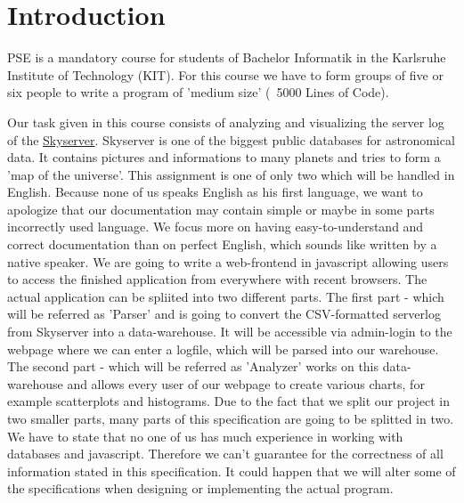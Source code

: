 \section*{Introduction}
PSE is a mandatory course for students of Bachelor Informatik in the Karlsruhe Institute of Technology (KIT). 
For this course we have to form groups of five or six people to write a program of 'medium size' (~5000 Lines of Code).

 Our task given in this course consists of
analyzing and visualizing the server log of the \href{http://skyserver.sdss.org/public/en/}{Skyserver}.
Skyserver is one of the biggest public databases for astronomical data. It contains pictures and informations to many planets
and tries to form a 'map of the universe'.
\newline\newline
This assignment is one of only two which will be handled 
in English.
Because none of us speaks English as his first language, 
we want to apologize that our documentation may contain simple 
or maybe in some parts incorrectly used language. We focus more on 
having easy-to-understand and correct documentation 
than on perfect English, which sounds like written by a native speaker.
\newline\newline
We are going to write a web-frontend in javascript allowing users 
to access the finished application from everywhere
with recent browsers. The actual application can be spliited into two 
different parts. The first part - which will be referred as 'Parser' and is going to convert the CSV-formatted 
serverlog from Skyserver into a data-warehouse. It will
be accessible via admin-login to the webpage where we can enter a 
logfile, which will be parsed into our warehouse.
The second part - which will be referred as 'Analyzer' works on this data-warehouse 
and allows every user of our webpage to create various charts, 
for example scatterplots and histograms.
Due to the fact that we split our project in two smaller parts, 
many parts of this specification are going to be splitted in two.
\newline
\newline
We have to state that no one of us has much experience in working 
with databases and javascript.
Therefore we can't guarantee for the correctness of all information 
stated in this specification.
It could happen that we will alter some of the specifications when designing or 
implementing the actual program.
